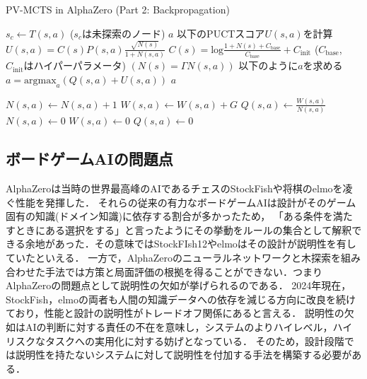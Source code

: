 \begin{algorithm}
    \caption{PV-MCTS in AlphaZero (Part 2: Backpropagation)}
    \label{alg:mcts-2}
    \begin{algorithmic}[1]
                \State $s_c \gets T(s, a)$ ($s_c$は未探索のノード)
                \State {}
                \State \Return $a$
            \Else
                \State 以下のPUCTスコア$U(s, a)$を計算
                \State $U(s, a)= C(s)P(s, a)\frac{\sqrt{N(s)}}{1+N(s, a)}$
                \State $C(s)=\textrm{log}\frac{1+N(s)+C_{\textrm{base}}}{C_{\textrm{base}}}+C_{\textrm{init}}$
                \State($C_{\textrm{base}}$, $C_{\textrm{init}}$はハイパーパラメータ)
                \State $(N(s)=\Gamma N(s, a))$
                \State 以下のように$a$を求める
                \State $a = {\textrm{argmax}}_a (Q(s, a)+U(s, a))$
                \State \Return $a$
                
            \EndIf
        \EndFunction
                \State $N(s, a) \gets  N(s, a)+1$
                \State $W(s, a) \gets  W(s, a)+G$
                \State $Q(s, a) \gets \frac{W(s, a)}{N(s, a)}$
            \EndFor
        \EndFunction
                \State $N(s, a) \gets 0$
                \State $W(s, a) \gets 0$
                \State $Q(s, a) \gets 0$
            \EndFor
        \EndFunction
    \end{algorithmic}
\end{algorithm}


\subsection{ボードゲームAIの問題点}
AlphaZeroは当時の世界最高峰のAIであるチェスのStockFish\cite{StockFish}や将棋のelmo\cite{elmo}を凌ぐ性能を発揮した．
それらの従来の有力なボードゲームAIは設計がそのゲーム固有の知識(ドメイン知識)に依存する割合が多かったため，
「ある条件を満たすときにある選択をする」と言ったようにその挙動をルールの集合として解釈できる余地があった．その意味ではStockFIsh12やelmoはその設計が説明性を有していたといえる．
一方で，AlphaZeroのニューラルネットワークと木探索を組み合わせた手法では方策と局面評価の根拠を得ることができない．つまりAlphaZeroの問題点として説明性の欠如が挙げられるのである．
2024年現在，StockFish，elmoの両者も人間の知識データへの依存を減じる方向に改良を続けており，性能と設計の説明性がトレードオフ関係にあると言える\cite{elmo}\cite{StockFish13}．
説明性の欠如はAIの判断に対する責任の不在を意味し，システムのよりハイレベル，ハイリスクなタスクへの実用化に対する妨げとなっている．
そのため，設計段階では説明性を持たないシステムに対して説明性を付加する手法を構築する必要がある．




